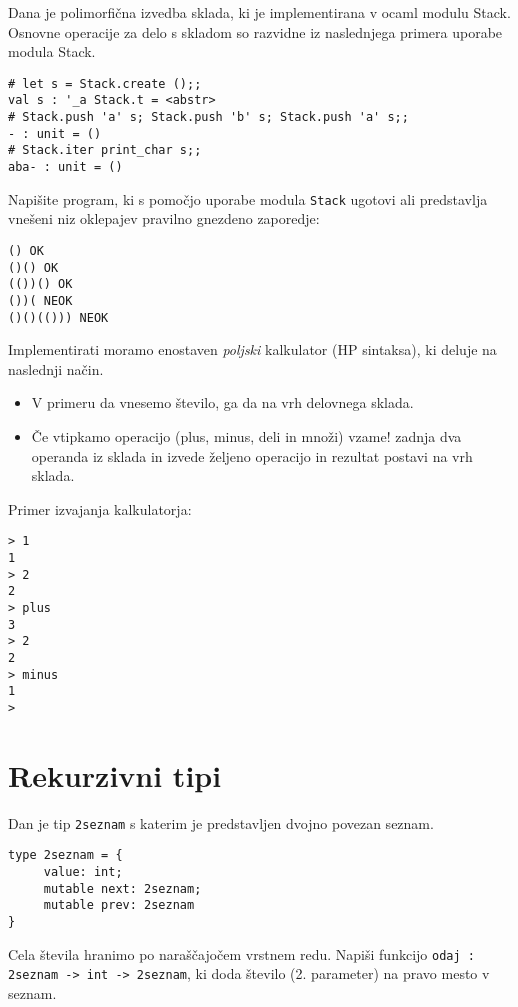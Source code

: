 \begin{ex}
Dana je polimorfi\v cna izvedba sklada, ki je implementirana v ocaml modulu Stack. Osnovne operacije za delo s skladom so razvidne iz naslednjega primera uporabe modula Stack.

\begin{lstlisting}
# let s = Stack.create ();;
val s : '_a Stack.t = <abstr>
# Stack.push 'a' s; Stack.push 'b' s; Stack.push 'a' s;;
- : unit = ()
# Stack.iter print_char s;;
aba- : unit = ()
\end{lstlisting}

Napi\v site program, ki s pomo\v cjo uporabe modula \lstinline{Stack} ugotovi ali predstavlja vne\v seni niz oklepajev pravilno gnezdeno zaporedje:

\begin{lstlisting}
() OK
()() OK
(())() OK
())( NEOK
()()(())) NEOK
\end{lstlisting}
\end{ex}



\begin{ex}
Implementirati moramo enostaven \emph{poljski} kalkulator (HP sintaksa), ki deluje na naslednji na\v cin.
\begin{itemize}
\item V primeru da vnesemo \v stevilo, ga da na vrh delovnega sklada.
\item \v Ce vtipkamo operacijo (plus, minus, deli in mno\v zi) vzame! zadnja dva operanda iz sklada in izvede \v zeljeno operacijo in rezultat postavi na vrh sklada.
\end{itemize}

Primer izvajanja kalkulatorja:
\begin{lstlisting}
> 1
1
> 2
2
> plus
3
> 2
2
> minus
1
>
\end{lstlisting}
\end{ex}



\section{Rekurzivni tipi}


\begin{ex}
Dan je tip \lstinline{2seznam} s katerim je predstavljen dvojno povezan seznam.

\begin{lstlisting}
type 2seznam = {
     value: int;
     mutable next: 2seznam;
     mutable prev: 2seznam
}
\end{lstlisting}

Cela \v stevila hranimo po nara\v s\v cajo\v cem vrstnem redu. Napi\v si funkcijo \lstinline{odaj : 2seznam -> int -> 2seznam}, ki doda \v stevilo (2. parameter) na pravo mesto v seznam.
\end{ex} 






